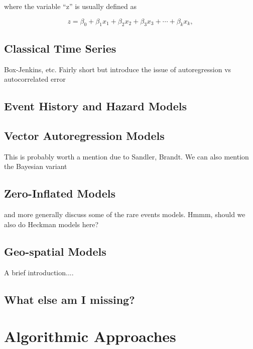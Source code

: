\documentclass[graybox]{svmult}
\begin{document}
where the variable ``z'' is usually defined as

\begin{equation}
z=\beta_0 + \beta_1x_1 + \beta_2x_2 + \beta_3x_3 + \cdots + \beta_kx_k,
\end{equation}

\subsection{Classical Time Series}
\label{sec:timeseries}

Box-Jenkins, etc. Fairly short but introduce the issue of autoregression vs autocorrelated error

\subsection{Event History and Hazard Models}
\label{subsec:eventhistl}

\subsection{Vector Autoregression Models}
\label{subsec:VAR}

This is probably worth a mention due to Sandler, Brandt. We can also mention the Bayesian variant

\subsection{Zero-Inflated Models}
\label{subsec:ZI}

and more generally discuss some of the rare events models. Hmmm, should we also do Heckman models here?

\subsection{Geo-spatial Models}
\label{subsec:ZI}

A brief introduction....

\subsection{What else am I missing?}
\label{subsec:missing}



\section{Algorithmic Approaches}
\label{sec:algor}
\end{document}
